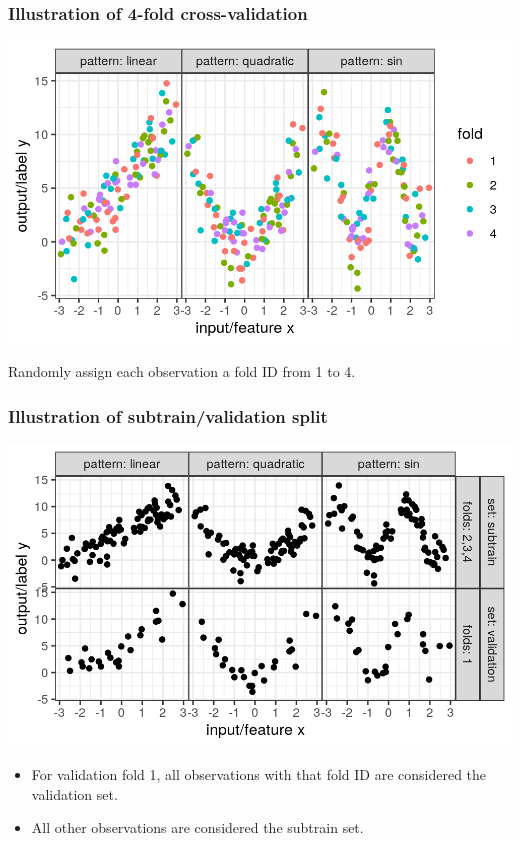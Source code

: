 \documentclass{beamer}
\begin{document}
\begin{frame}
  \frametitle{Illustration of 4-fold cross-validation}
  \includegraphics[width=\textwidth]{figure-overfitting-data-folds}

  Randomly assign each observation a fold ID from 1 to 4.
  
\end{frame}

\begin{frame}
  \frametitle{Illustration of subtrain/validation split}
  \includegraphics[width=\textwidth]{figure-overfitting-data-sets}

  \begin{itemize}
  \item For validation fold 1, all observations with that fold ID are
    considered the validation set.
  \item All other observations are considered the subtrain set.
  \end{itemize}
\end{frame}
\end{document}
